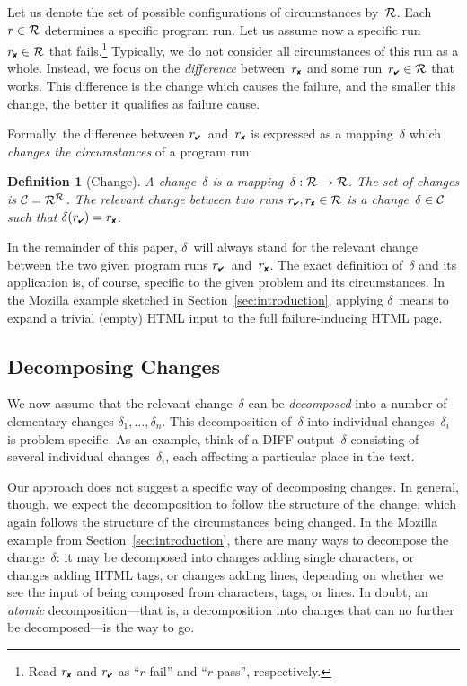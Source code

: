 \documentclass{acm_proc_article-sp}
\newcommand{\DIFF}       {{\small DIFF}\xspace}
\newcommand{\HTML}       {{\small HTML}\xspace}
\newcommand{\PASS}{\text{\ding{52}}\xspace}
\newcommand{\FAIL}{\text{\ding{56}}\xspace}
\newcommand{\CC}{{\cal C}}
\newcommand{\RR}{{\cal R}}
\newcommand{\rpass}{{r_{\scriptscriptstyle \PASS}}}
\newcommand{\rfail}{{r_{\scriptscriptstyle \FAIL}}}
\theoremstyle{plain}
\newtheorem{definition}{Definition}
\let\oldfootnote=\footnote
\renewcommand{\footnote}[1]{\oldfootnote{\let\small=\scriptsize #1}}
\begin{document}
Let us denote the set of possible configurations of circumstances
by~$\RR$.  Each $r \in \RR$ determines a specific program run.  Let us
assume now a specific run~$\rfail \in \RR$ that fails.\footnote{Read
  $\rfail$ and $\rpass$ as ``$r$-fail'' and ``$r$-pass'',
  respectively.}  Typically, we do not consider all circumstances of
this run as a whole.  Instead, we focus on the \emph{difference}
between~$\rfail$ and some run~$\rpass \in \RR$ that works.  This
difference is the change which causes the failure, and the smaller
this change, the better it qualifies as failure cause.

Formally, the difference between $\rpass$~and~$\rfail$ is expressed as
a mapping~$\delta$ which \emph{changes the circumstances} of a program run:

\begin{definition}[Change]
  A \emph{change}~$\delta$ is a mapping~$\delta : \RR \to \RR$.  The set of
  changes is $\CC = \RR^\RR$.  The \emph{relevant change} between
  two runs $\rpass, \rfail \in \RR$ is a change~$\delta \in \CC$ such that
  $\delta(\rpass) = \rfail$.
\end{definition}

In the remainder of this paper, $\delta$~will always stand for the relevant
change between the two given program runs $\rpass$~and~$\rfail$.  The
exact definition of~$\delta$ and its application is, of course, specific to
the given problem and its circumstances.  In the Mozilla example
sketched in Section~\ref{sec:introduction}, applying $\delta$~means to
expand a trivial (empty) \HTML input to the full failure-inducing
\HTML page.


\subsection{Decomposing Changes}

We now assume that the relevant change~$\delta$ can be \emph{decomposed}
into a number of elementary changes $\delta_1, \dots, \delta_n$.  This
decomposition of~$\delta$ into individual changes~$\delta_i$ is
problem-specific.  As an example, think of a \DIFF output~$\delta$
consisting of several individual changes~$\delta_i$, each affecting a
particular place in the text.  

Our approach does not suggest a specific way of decomposing changes.
In general, though, we expect the decomposition to follow the
structure of the change, which again follows the structure of the
circumstances being changed.  In the Mozilla example from
Section~\ref{sec:introduction}, there are many ways to decompose the
change~$\delta$: it may be decomposed into changes adding single
characters, or changes adding \HTML tags, or changes adding lines,
depending on whether we see the input of being composed from
characters, tags, or lines.  In doubt, an \emph{atomic}
decomposition---that is, a decomposition into changes that can no
further be decomposed---is the way to go.
\end{document}
